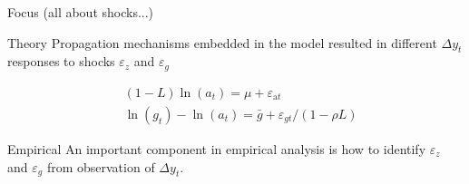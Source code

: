 \documentclass[10pt]{beamer}
\begin{document}
\begin{frame}{Focus (all about shocks...)}
    \begin{exampleblock}{Theory}
        Propagation mechanisms embedded in the model resulted in different $\Delta y_t$ responses to shocks $\varepsilon_z$ and $\varepsilon_g$
    \end{exampleblock}
    \begin{align}
         & (1-L) \ln \left(a_{t}\right)=\mu+\varepsilon_{\mathrm{a} t}                         \\
         & \ln \left(g_{t}\right)-\ln \left(a_{t}\right)=\bar{g}+\varepsilon_{g t} /(1-\rho L)
    \end{align}

    \begin{exampleblock}{Empirical}
        An important component in empirical analysis is how to identify $\varepsilon_z$ and $\varepsilon_g$ from observation of $\Delta y_t$.
    \end{exampleblock}
\end{frame}
%
\end{document}

